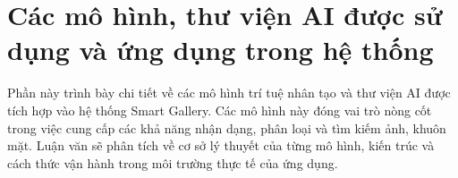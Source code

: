 \section{Các mô hình, thư viện AI được sử dụng và ứng dụng trong hệ thống}

Phần này trình bày chi tiết về các mô hình trí tuệ nhân tạo và thư viện AI được tích hợp vào hệ thống Smart Gallery. Các mô hình này đóng vai trò nòng cốt trong việc cung cấp các khả năng nhận dạng, phân loại và tìm kiếm ảnh, khuôn mặt. Luận văn sẽ phân tích về cơ sở lý thuyết của từng mô hình, kiến trúc và cách thức vận hành trong môi trường thực tế của ứng dụng.


